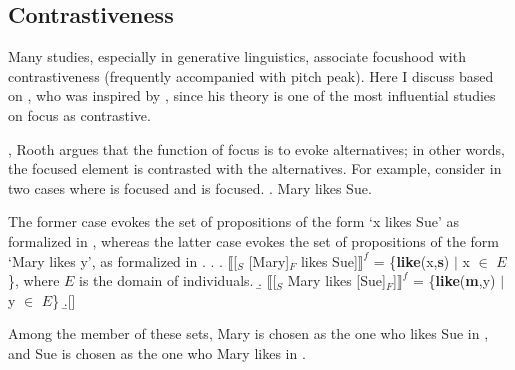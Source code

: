 \subsection{Contrastiveness}\label{Back:Foc:Contr}

Many studies, especially in generative linguistics,
associate focushood with contrastiveness (frequently accompanied with pitch peak).
Here I discuss based on ,
who was inspired by ,
since his theory is one of the most influential studies on focus as contrastive.

,
Rooth argues that the function of focus is to evoke alternatives;
in other words,
the focused element is contrasted with the alternatives.
For example, consider \Next in two cases
where  is focused and  is focused.
%
\ex. Mary likes Sue.

The former case evokes the set of propositions of the form `x likes Sue'
as formalized in \Next[a],
whereas the latter case evokes the set of propositions of the form `Mary likes y', as formalized in \Next[b].
%
\ex.
  \a. $\llbracket$[$_{S}$ [Mary]$_{F}$ likes Sue]$\rrbracket^{f}$ = \{\textbf{like}(x,\textbf{s}) $\mid$ x $\in$ $E$\}, where $E$ is the domain of individuals.
  \b. $\llbracket$[$_{S}$ Mary likes [Sue]$_{F}$]$\rrbracket^{f}$ = \{\textbf{like}(\textbf{m},y) $\mid$ y $\in$ $E$\}
  \b.[] \hfill{\cite[76]{rooth92}}

Among the member of these sets,
Mary is chosen as the one who likes Sue in \Last[a],
and Sue is chosen as the one who Mary likes in \Last[b].

